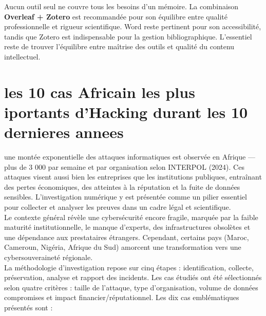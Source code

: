 \documentclass[12pt, a4em]{article}
\begin{document}
	Aucun outil seul ne couvre tous les besoins d'un mémoire. La combinaison \textbf{Overleaf + Zotero} est recommandée pour son équilibre entre qualité professionnelle et rigueur scientifique. Word reste pertinent pour son accessibilité, tandis que Zotero est indispensable pour la gestion bibliographique. L'essentiel reste de trouver l'équilibre entre maîtrise des outils et qualité du contenu intellectuel.
	
	
	\section{les 10 cas Africain les plus iportants d'Hacking durant les 10 dernieres annees}
	
	
	 une  montée exponentielle des attaques informatiques est observée en Afrique — plus de 3 000 par semaine et par organisation selon INTERPOL (2024). Ces attaques visent aussi bien les entreprises que les institutions publiques, entraînant des pertes économiques, des atteintes à la réputation et la fuite de données sensibles. L’investigation numérique y est présentée comme un pilier essentiel pour collecter et analyser les preuves dans un cadre légal et scientifique.\\
	Le contexte général révèle une cybersécurité encore fragile, marquée par la faible maturité institutionnelle, le manque d’experts, des infrastructures obsolètes et une dépendance aux prestataires étrangers. Cependant, certains pays (Maroc, Cameroun, Nigéria, Afrique du Sud) amorcent une transformation vers une cybersouveraineté régionale.\\
	La méthodologie d’investigation repose sur cinq étapes : identification, collecte, préservation, analyse et rapport des incidents. Les cas étudiés ont été sélectionnés selon quatre critères : taille de l’attaque, type d’organisation, volume de données compromises et impact financier/réputationnel.
	Les dix cas emblématiques présentés sont :
\end{document}
